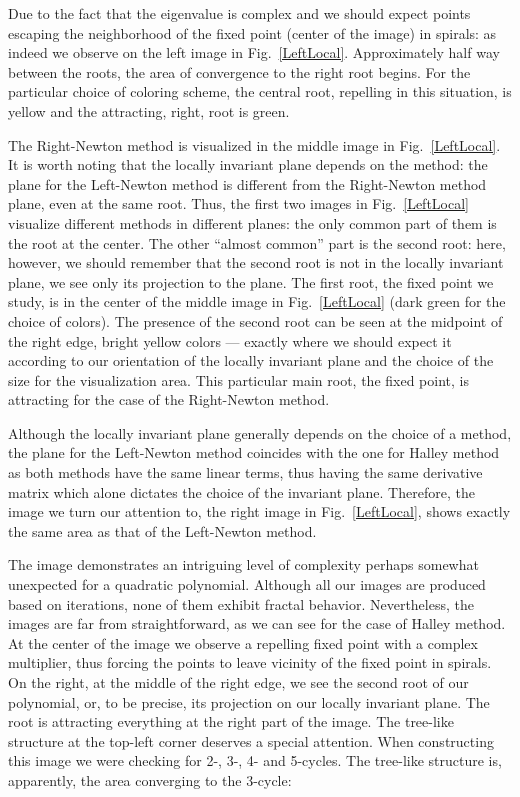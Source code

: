 \documentclass{article}
\theoremstyle{definition}
\begin{document}
Due to the fact that the eigenvalue  is complex and   we should expect points escaping the neighborhood of the fixed point (center of the image) in spirals: as indeed we observe on the left image in Fig.~\ref{LeftLocal}. Approximately half way between the roots, the area of convergence to the right root begins. For the particular choice of coloring scheme, the central root, repelling in this situation, is yellow and the attracting, right, root is green.

The Right-Newton method is visualized in the middle image in Fig.~\ref{LeftLocal}. It is worth noting that the locally invariant plane depends on the method: the plane for the Left-Newton method is different from the Right-Newton method plane, even at the same root. Thus, the first two images in Fig.~\ref{LeftLocal}  visualize different methods in different planes: the only common part of them is the root at the center. The other ``almost common'' part is the second root: here, however, we should remember that the second root is not in the locally invariant plane, we see only its projection to the plane. The first root, the fixed point we study, is in the center of the middle image in Fig.~\ref{LeftLocal} (dark green for the choice of colors). The presence of the second root can be seen at the midpoint of the right edge, bright yellow colors --- exactly where we should expect it according to our orientation of the locally invariant plane and the choice of the size for the visualization area. This particular main root, the fixed point, is attracting for the case of the Right-Newton method.

Although the locally invariant plane generally depends on the choice of a method, the plane for the Left-Newton method coincides with the one for Halley method as both methods have the same linear terms, thus having the same derivative matrix which alone dictates the choice of the invariant plane. Therefore, the image we turn our attention to, the right image in Fig.~\ref{LeftLocal}, shows exactly the same area as that of the Left-Newton method.

The image demonstrates an intriguing level of complexity perhaps somewhat unexpected for a quadratic polynomial. Although all our images are produced based on iterations, none of them exhibit fractal behavior. Nevertheless, the images are far from straightforward, as we can see for the case of Halley method. At the center of the image we observe a repelling fixed point with a complex multiplier, thus forcing the points to leave vicinity of the fixed point in spirals.  On the right, at the middle of the right edge, we see the second root of our polynomial, or, to be precise, its projection on our locally invariant plane. The root is attracting everything at the right part of the image. The tree-like structure at the top-left corner deserves a special attention. When constructing this image we were checking for 2-, 3-, 4- and 5-cycles. The tree-like structure is, apparently, the area converging to the 3-cycle:
\end{document}
